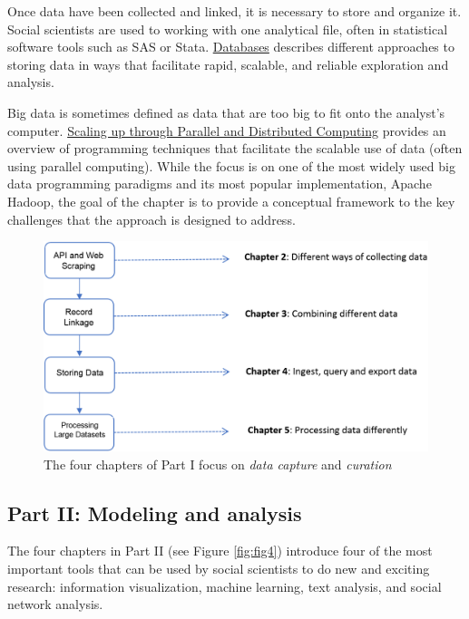 \documentclass[]{krantz}
\begin{document}
Once data have been collected and linked, it is necessary to store and
organize it. Social scientists are used to working with one analytical
file, often in statistical software tools such as SAS or Stata.
\protect\hyperlink{chap:db}{Databases} describes different approaches to
storing data in ways that facilitate rapid, scalable, and reliable
exploration and analysis.

Big data is sometimes defined as data that are too big to fit onto the
analyst's computer. \protect\hyperlink{chap:parallel}{Scaling up through
Parallel and Distributed Computing} provides an overview of programming
techniques that facilitate the scalable use of data (often using
parallel computing). While the focus is on one of the most widely used
big data programming paradigms and its most popular implementation,
Apache Hadoop, the goal of the chapter is to provide a conceptual
framework to the key challenges that the approach is designed to
address.

\begin{figure}

{\centering \includegraphics[width=0.9\linewidth]{ChapterIntro/figures/Figure2_new} 

}

\caption{The four chapters of Part I focus on \textit{data capture} and \textit{curation}}\label{fig:fig3}
\end{figure}

\subsection{Part II: Modeling and
analysis}\label{part-ii-modeling-and-analysis}

The four chapters in Part II (see Figure \ref{fig:fig4}) introduce four
of the most important tools that can be used by social scientists to do
new and exciting research: information visualization, machine learning,
text analysis, and social network analysis.
\end{document}
